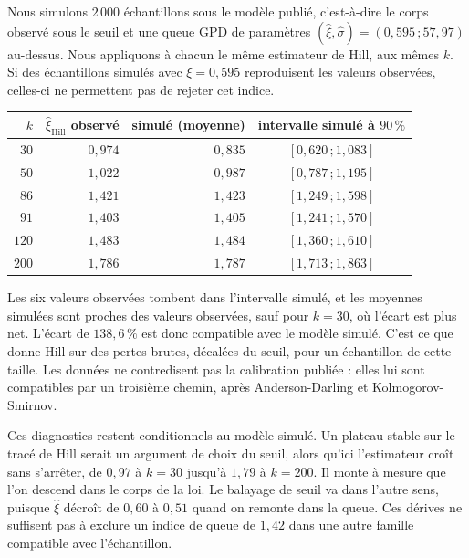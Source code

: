 Nous simulons $2\,000$ échantillons sous le modèle publié, c'est-à-dire le corps observé sous le seuil et
une queue GPD de paramètres $(\hat\xi,\hat\sigma) = (0{,}595\,;57{,}97)$ au-dessus. Nous appliquons à chacun
le même estimateur de Hill, aux mêmes $k$. Si des échantillons simulés avec $\xi=0{,}595$ reproduisent les valeurs
observées, celles-ci ne permettent pas de rejeter cet indice.

\begin{center}\footnotesize
\renewcommand{\arraystretch}{1.25}
\begin{tabular}{@{}r r r c@{}}
\toprule
$k$ & $\hat\xi_{\text{Hill}}$ observé & simulé (moyenne) & intervalle simulé à $90\,\%$ \\
\midrule
$30$  & $0{,}974$ & $0{,}835$ & $[0{,}620\,;1{,}083]$ \\
$50$  & $1{,}022$ & $0{,}987$ & $[0{,}787\,;1{,}195]$ \\
$86$  & $1{,}421$ & $1{,}423$ & $[1{,}249\,;1{,}598]$ \\
$91$  & $1{,}403$ & $1{,}405$ & $[1{,}241\,;1{,}570]$ \\
$120$ & $1{,}483$ & $1{,}484$ & $[1{,}360\,;1{,}610]$ \\
$200$ & $1{,}786$ & $1{,}787$ & $[1{,}713\,;1{,}863]$ \\
\bottomrule
\end{tabular}
\end{center}

\vspace{4pt}
\noindent Les six valeurs observées tombent dans l'intervalle simulé, et les moyennes simulées sont proches des valeurs observées, sauf pour $k=30$, où l'écart est plus net. L'écart de $138{,}6\,\%$ est donc compatible avec le modèle simulé. C'est ce que donne
Hill sur des pertes brutes, décalées du seuil, pour un échantillon de cette taille. Les données ne
contredisent pas la calibration publiée : elles lui sont compatibles par un troisième chemin, après
Anderson-Darling et Kolmogorov-Smirnov.

Ces diagnostics restent conditionnels au modèle simulé. Un plateau stable sur le tracé de Hill
serait un argument de choix du seuil, alors qu'ici l'estimateur croît sans s'arrêter, de $0{,}97$ à $k=30$ jusqu'à $1{,}79$
à $k=200$. Il monte à mesure que l'on descend dans le corps de la loi. Le balayage de seuil va dans l'autre
sens, puisque $\hat\xi$ décroît de $0{,}60$ à $0{,}51$ quand on remonte dans la queue. Ces dérives ne suffisent pas à exclure
un indice de queue de $1{,}42$ dans une autre famille compatible avec l'échantillon.

